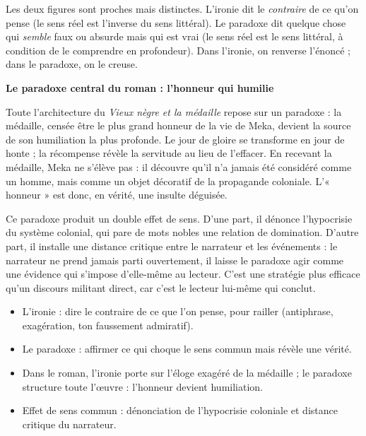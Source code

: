 \documentclass[11pt]{article}
\newcommand{\cle}[1]{{\popxbold\color{popdark}#1}}
\begin{document}
\begin{attention}
Les deux figures sont proches mais distinctes. L'\cle{ironie} dit le \emph{contraire} de ce qu'on pense (le sens réel est l'inverse du sens littéral). Le \cle{paradoxe} dit quelque chose qui \emph{semble} faux ou absurde mais qui est vrai (le sens réel est le sens littéral, à condition de le comprendre en profondeur). Dans l'ironie, on renverse l'énoncé ; dans le paradoxe, on le creuse.
\end{attention}

\textbf{Le paradoxe central du roman : l'honneur qui humilie}

Toute l'architecture du \emph{Vieux nègre et la médaille} repose sur un paradoxe : la médaille, censée être le plus grand honneur de la vie de Meka, devient la source de son humiliation la plus profonde. Le jour de gloire se transforme en jour de honte ; la récompense révèle la servitude au lieu de l'effacer. En recevant la médaille, Meka ne s'élève pas : il découvre qu'il n'a jamais été considéré comme un homme, mais comme un objet décoratif de la propagande coloniale. L'« honneur » est donc, en vérité, une insulte déguisée.

Ce paradoxe produit un double effet de sens. D'une part, il dénonce l'hypocrisie du système colonial, qui pare de mots nobles une relation de domination. D'autre part, il installe une \cle{distance critique} entre le narrateur et les événements : le narrateur ne prend jamais parti ouvertement, il laisse le paradoxe agir comme une évidence qui s'impose d'elle-même au lecteur. C'est une stratégie plus efficace qu'un discours militant direct, car c'est le lecteur lui-même qui conclut.

\begin{aretenir}[L'essentiel]
\begin{itemize}
\item L'\cle{ironie} : dire le contraire de ce que l'on pense, pour railler (antiphrase, exagération, ton faussement admiratif).
\item Le \cle{paradoxe} : affirmer ce qui choque le sens commun mais révèle une vérité.
\item Dans le roman, l'ironie porte sur l'éloge exagéré de la médaille ; le paradoxe structure toute l'œuvre : l'honneur devient humiliation.
\item Effet de sens commun : dénonciation de l'hypocrisie coloniale et distance critique du narrateur.
\end{itemize}
\end{aretenir}
\end{document}

